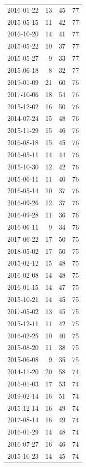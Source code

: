 \begin{tabular}{lrrr}
2016-01-22 & 13 & 45 & 77 \\
2015-05-15 & 11 & 42 & 77 \\
2016-10-20 & 14 & 41 & 77 \\
2015-05-22 & 10 & 37 & 77 \\
2015-05-27 & 9 & 33 & 77 \\
2015-06-18 & 8 & 32 & 77 \\
2019-01-09 & 21 & 60 & 76 \\
2017-10-06 & 18 & 54 & 76 \\
2015-12-02 & 16 & 50 & 76 \\
2014-07-24 & 15 & 48 & 76 \\
2015-11-29 & 15 & 46 & 76 \\
2016-08-18 & 15 & 45 & 76 \\
2016-05-11 & 14 & 44 & 76 \\
2015-10-30 & 12 & 42 & 76 \\
2015-06-11 & 11 & 40 & 76 \\
2016-05-14 & 10 & 37 & 76 \\
2016-09-26 & 12 & 37 & 76 \\
2016-09-28 & 11 & 36 & 76 \\
2016-06-11 & 9 & 34 & 76 \\
2017-06-22 & 17 & 50 & 75 \\
2018-05-02 & 17 & 50 & 75 \\
2015-02-12 & 15 & 48 & 75 \\
2016-02-08 & 14 & 48 & 75 \\
2016-01-15 & 14 & 47 & 75 \\
2015-10-21 & 14 & 45 & 75 \\
2017-05-02 & 13 & 45 & 75 \\
2015-12-11 & 11 & 42 & 75 \\
2016-02-25 & 10 & 40 & 75 \\
2015-08-20 & 11 & 38 & 75 \\
2015-06-08 & 9 & 35 & 75 \\
2014-11-20 & 20 & 58 & 74 \\
2016-01-03 & 17 & 53 & 74 \\
2019-02-14 & 16 & 51 & 74 \\
2015-12-14 & 16 & 49 & 74 \\
2017-08-14 & 16 & 49 & 74 \\
2016-01-29 & 14 & 48 & 74 \\
2016-07-27 & 16 & 46 & 74 \\
2015-10-23 & 14 & 45 & 74 \\

\end{tabular}
